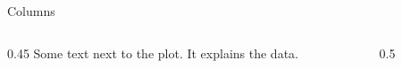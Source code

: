 \documentclass{beamer}
\begin{document}
\begin{frame}{Columns}
\begin{columns}
\begin{column}{0.45\textwidth}
Some text next to the plot. It explains the data.
\end{column}
\begin{column}{0.5\textwidth}
\end{column}
\end{columns}
\end{frame}
\end{document}
